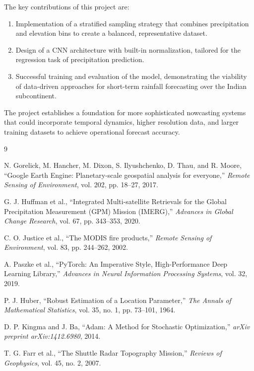 \documentclass[12pt, a4paper]{report}
\begin{document}
The key contributions of this project are:
\begin{enumerate}
    \item Implementation of a stratified sampling strategy that combines precipitation and elevation bins to create a balanced, representative dataset.
    \item Design of a CNN architecture with built-in normalization, tailored for the regression task of precipitation prediction.
    \item Successful training and evaluation of the model, demonstrating the viability of data-driven approaches for short-term rainfall forecasting over the Indian subcontinent.
\end{enumerate}

The project establishes a foundation for more sophisticated nowcasting systems that could incorporate temporal dynamics, higher resolution data, and larger training datasets to achieve operational forecast accuracy.


\begin{thebibliography}{9}

N. Gorelick, M. Hancher, M. Dixon, S. Ilyushchenko, D. Thau, and R. Moore, ``Google Earth Engine: Planetary-scale geospatial analysis for everyone,'' \textit{Remote Sensing of Environment}, vol. 202, pp. 18--27, 2017.

G. J. Huffman et al., ``Integrated Multi-satellite Retrievals for the Global Precipitation Measurement (GPM) Mission (IMERG),'' \textit{Advances in Global Change Research}, vol. 67, pp. 343--353, 2020.

C. O. Justice et al., ``The MODIS fire products,'' \textit{Remote Sensing of Environment}, vol. 83, pp. 244--262, 2002.

A. Paszke et al., ``PyTorch: An Imperative Style, High-Performance Deep Learning Library,'' \textit{Advances in Neural Information Processing Systems}, vol. 32, 2019.

P. J. Huber, ``Robust Estimation of a Location Parameter,'' \textit{The Annals of Mathematical Statistics}, vol. 35, no. 1, pp. 73--101, 1964.

D. P. Kingma and J. Ba, ``Adam: A Method for Stochastic Optimization,'' \textit{arXiv preprint arXiv:1412.6980}, 2014.

T. G. Farr et al., ``The Shuttle Radar Topography Mission,'' \textit{Reviews of Geophysics}, vol. 45, no. 2, 2007.

\end{thebibliography}
\end{document}
